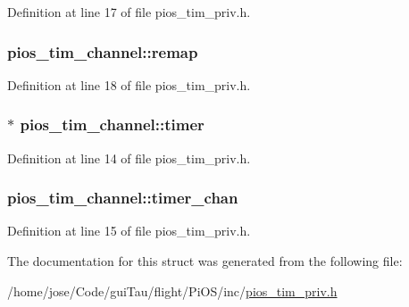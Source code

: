 Definition at line 17 of file pios\-\_\-tim\-\_\-priv.\-h.

\hypertarget{structpios__tim__channel_ac0c7199f77fa4e99068cda8572e02064}{
\subsubsection[{remap}]{ pios\-\_\-tim\-\_\-channel\-::remap}}\label{structpios__tim__channel_ac0c7199f77fa4e99068cda8572e02064}


Definition at line 18 of file pios\-\_\-tim\-\_\-priv.\-h.

\hypertarget{structpios__tim__channel_a07d1ffb5da40643ef9938fa9c4fad017}{
\subsubsection[{timer}]{$\ast$ pios\-\_\-tim\-\_\-channel\-::timer}}\label{structpios__tim__channel_a07d1ffb5da40643ef9938fa9c4fad017}


Definition at line 14 of file pios\-\_\-tim\-\_\-priv.\-h.

\hypertarget{structpios__tim__channel_a66cede40f7ef0785c0941c49ea162b59}{
\subsubsection[{timer\-\_\-chan}]{ pios\-\_\-tim\-\_\-channel\-::timer\-\_\-chan}}\label{structpios__tim__channel_a66cede40f7ef0785c0941c49ea162b59}


Definition at line 15 of file pios\-\_\-tim\-\_\-priv.\-h.



The documentation for this struct was generated from the following file\-:\begin{DoxyCompactItemize}
\item 
/home/jose/\-Code/gui\-Tau/flight/\-Pi\-O\-S/inc/\hyperlink{pios__tim__priv_8h}{pios\-\_\-tim\-\_\-priv.\-h}\end{DoxyCompactItemize}
